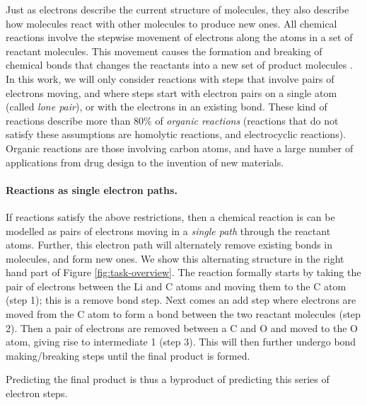 Just as electrons describe the current structure of molecules, 
they also describe how molecules react with other molecules to produce new ones. 
All chemical reactions involve the stepwise movement of electrons along the atoms in a set of reactant molecules. 
This movement causes the formation and breaking of chemical bonds that changes the reactants into a new set of product molecules \cite{herges1994coarctate}.
In this work, we will only consider reactions with steps that involve pairs of electrons moving, and
where steps start with electron pairs on a single atom (called \emph{lone pair}), or with the electrons in an existing bond. 
These kind of reactions describe more than 80\% of \emph{organic reactions} \cite{herges1994coarctate} 
(reactions that do not satisfy these assumptions are homolytic reactions, and electrocyclic reactions).
Organic reactions are those involving carbon atoms, and have a large number of applications from drug design to the invention of new materials\cite{segler2018planning}.

\vspace{-0.15cm}
\paragraph{Reactions as single electron paths.}
If reactions satisfy the above restrictions, then a chemical reaction is can be modelled as pairs of electrons moving in a \emph{single path} through the reactant atoms. 
Further, this electron path will alternately remove existing bonds in molecules, and form new ones. We show this alternating structure in the right hand part of Figure \ref{fig:task-overview}. 
The reaction formally starts by taking the pair of electrons between the Li and C atoms and moving them to the C atom (step 1); this is a remove bond step. 
Next comes an add step where electrons are moved from the C atom to form a bond between the two reactant molecules (step 2).
Then a pair of electrons are removed between a C and O and moved to the O atom, giving rise to intermediate 1 (step 3). This will then further undergo bond making/breaking steps until the final product is formed.

Predicting the final product is thus a byproduct of predicting this series of electron steps.

